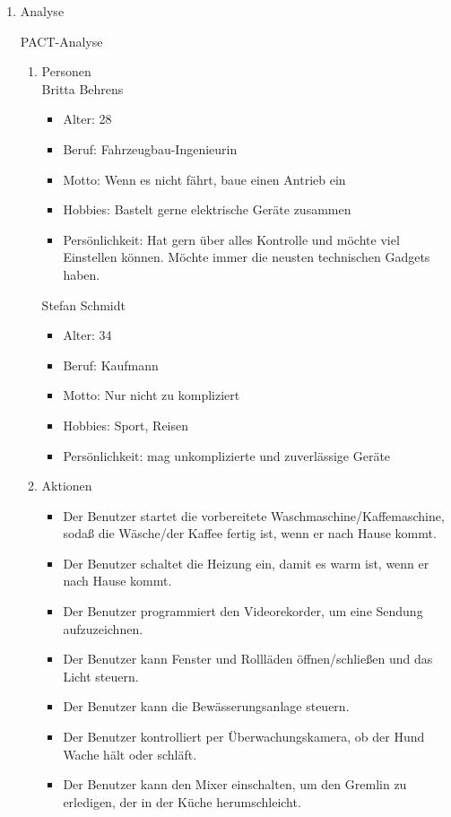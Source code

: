 \documentclass[a4paper,10pt]{article}
\begin{document}
\kopf
\renewcommand{\figurename}{Figure}

\begin{enumerate}
\item Analyse

PACT-Analyse

\begin{enumerate}
\item Personen\\
Britta Behrens
\begin{itemize}
\item Alter: 28
\item Beruf: Fahrzeugbau-Ingenieurin
\item Motto: Wenn es nicht fährt, baue einen Antrieb ein
\item Hobbies: Bastelt gerne elektrische Geräte zusammen
\item Persönlichkeit: Hat gern über alles Kontrolle und möchte viel Einstellen können. Möchte immer die neusten technischen Gadgets haben.
\end{itemize}

Stefan Schmidt
\begin{itemize}
\item Alter: 34
\item Beruf: Kaufmann
\item Motto: Nur nicht zu kompliziert
\item Hobbies: Sport, Reisen
\item Persönlichkeit: mag unkomplizierte und zuverlässige Geräte
\end{itemize}

\item Aktionen

\begin{itemize}
\item Der Benutzer startet die vorbereitete Waschmaschine/Kaffemaschine, sodaß die Wäsche/der Kaffee fertig ist, wenn er nach Hause kommt.
\item Der Benutzer schaltet die Heizung ein, damit es warm ist, wenn er nach Hause kommt.
\item Der Benutzer programmiert den Videorekorder, um eine Sendung aufzuzeichnen.
\item Der Benutzer kann Fenster und Rollläden öffnen/schließen und das Licht steuern.
\item Der Benutzer kann die Bewässerungsanlage steuern.
\item Der Benutzer kontrolliert per Überwachungskamera, ob der Hund Wache hält oder schläft.
\item Der Benutzer kann den Mixer einschalten, um den Gremlin zu erledigen, der in der Küche herumschleicht.
\end{itemize}


\end{enumerate}
\end{enumerate}
\end{document}
